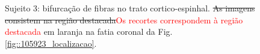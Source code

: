 \begin{figure}[H]
\centering
    \hfill
    \caption{Sujeito 3: bifurcação de fibras no trato cortico-espinhal. \sout{As imagens consistem na região destacada}\textcolor{red}{Os recortes correspondem à região destacada} em laranja na fatia coronal da Fig. \ref{fig::105923_localizacao}.
    }
    \label{fig::105923_fanning}
\end{figure}

